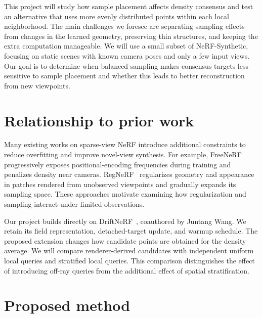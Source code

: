 \documentclass[sigconf,nonacm]{acmart}
\begin{document}
This project will study how sample placement affects density consensus and test an alternative that uses more evenly distributed points within each local neighborhood. The main challenges we foresee are separating sampling effects from changes in the learned geometry, preserving thin structures, and keeping the extra computation manageable. We will use a small subset of NeRF-Synthetic, focusing on static scenes with known camera poses and only a few input views. Our goal is to determine when balanced sampling makes consensus targets less sensitive to sample placement and whether this leads to better reconstruction from new viewpoints.


\section{Relationship to prior work}\label{sec:related}

Many existing works on sparse-view NeRF introduce additional constraints to reduce overfitting and improve novel-view synthesis. For example, FreeNeRF~\citep{yang2023freenerf} progressively exposes positional-encoding frequencies during training and penalizes density near cameras. RegNeRF~\citep{niemeyer2022regnerf} regularizes geometry and appearance in patches rendered from unobserved viewpoints and gradually expands its sampling space. These approaches motivate examining how regularization and sampling interact under limited observations.

Our project builds directly on DriftNeRF~\citep{wang2026driftnerf}, coauthored by Juntang Wang. We retain its field representation, detached-target update, and warmup schedule. The proposed extension changes how candidate points are obtained for the density average. We will compare renderer-derived candidates with independent uniform local queries and stratified local queries. This comparison distinguishes the effect of introducing off-ray queries from the additional effect of spatial stratification.

\clearpage
\section{Proposed method}
\end{document}
